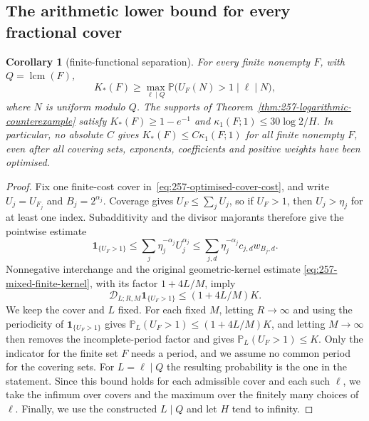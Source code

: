 \documentclass[11pt]{article}
\theoremstyle{plain}
\newtheorem{cor}[thm]{Corollary}
\theoremstyle{definition}
\theoremstyle{remark}
\begin{document}
\subsection{The arithmetic lower bound for every fractional cover}
\begin{cor}[finite-functional separation]\label{cor:257-logarithmic-separation}
For every finite nonempty $F$, with $Q=\operatorname{lcm}(F)$,
\begin{equation}
 K_*(F)\ge\max_{\ell\mid Q}
   \mathbb P\bigl(U_F(N)>1\mid\ell\mid N\bigr),
 \label{eq:257-arithmetic-cover-lower}
\end{equation}
where $N$ is uniform modulo $Q$.
The supports of Theorem~\ref{thm:257-logarithmic-counterexample} satisfy
$K_*(F)\ge1-e^{-1}$ and $\kappa_1(F;1)\le30\log2/H$.
In particular, no absolute $C$ gives $K_*(F)\le C\kappa_1(F;1)$
for all finite nonempty $F$, even after all covering sets, exponents, coefficients
and positive weights have been optimised.
\end{cor}
\begin{proof}
Fix one finite-cost cover in~\eqref{eq:257-optimised-cover-cost}, and write
$U_j=U_{F_j}$ and $B_j=2^{\alpha_j}$.
Coverage gives $U_F\le\sum_jU_j$, so if $U_F>1$, then $U_j>\eta_j$
for at least one index.  Subadditivity and the divisor majorants therefore
give the pointwise estimate
\[
 \mathbf1_{\{U_F>1\}}
 \le\sum_j\eta_j^{-\alpha_j}U_j^{\alpha_j}
 \le\sum_{j,d}\eta_j^{-\alpha_j}c_{j,d}w_{B_j,d}.
\]
Nonnegative interchange and the original geometric-kernel estimate
\eqref{eq:257-mixed-finite-kernel}, with its factor $1+4L/M$, imply
\[
 \mathscr D_{L;R,M}\mathbf1_{\{U_F>1\}}\le(1+4L/M)K.
\]
We keep the cover and $L$ fixed. For each fixed $M$, letting $R\to\infty$
and using the periodicity of $\mathbf1_{\{U_F>1\}}$ gives
$\mathbb P_L(U_F>1)\le(1+4L/M)K$, and letting $M\to\infty$ then removes
the incomplete-period factor and gives
$\mathbb P_L(U_F>1)\le K$.
Only the indicator for the finite set $F$ needs a period, and we assume no common
period for the covering sets.
For $L=\ell\mid Q$ the resulting probability is the one in the statement.
Since this bound holds for each admissible cover and each such $\ell$,
we take the infimum over covers and the maximum over the finitely many
choices of $\ell$.  Finally, we use the constructed
$L\mid Q$ and let $H$ tend to infinity.
\end{proof}
\end{document}
